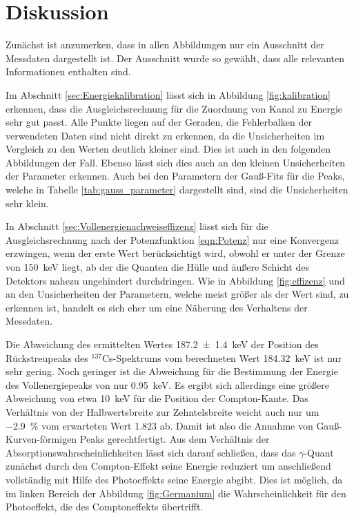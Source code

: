 \section{Diskussion}
\label{sec:Diskussion}
Zunächst ist anzumerken, dass in allen Abbildungen nur ein Ausschnitt
der Messdaten dargestellt ist. Der Ausschnitt wurde so gewählt, dass alle
relevanten Informationen enthalten sind.

Im Abschnitt \ref{sec:Energiekalibration} lässt sich in Abbildung \ref{fig:kalibration}
erkennen, dass die Ausgleichsrechnung für die Zuordnung von Kanal zu Energie
sehr gut passt. Alle Punkte liegen auf der Geraden, die Fehlerbalken der
verwendeten Daten sind nicht direkt zu erkennen, da die Unsicherheiten im Vergleich zu
den Werten deutlich kleiner sind. Dies ist auch in den folgenden Abbildungen
der Fall. Ebenso lässt sich dies auch an den kleinen Unsicherheiten der Parameter erkennen.
Auch bei den Parametern der Gauß-Fits für die Peaks, welche in Tabelle
\ref{tab:gauss_parameter} dargestellt sind, sind die Unsicherheiten sehr klein.

In Abschnitt \ref{sec:Vollenergienachweiseffizenz} lässt sich für die Ausgleichsrechnung nach
der Potenzfunktion \ref{eqn:Potenz} nur eine Konvergenz erzwingen, wenn der erste Wert
berücksichtigt wird, obwohl er unter der Grenze von \SI{150}{\kilo\electronvolt}
liegt, ab der die Quanten die Hülle und äußere Schicht des Detektors nahezu ungehindert 
durchdringen. Wie in Abbildung \ref{fig:effizenz} und an den Unsicherheiten der 
Parametern, welche meist größer als der Wert sind, zu erkennen ist, handelt es sich
eher um eine Näherung des Verhaltens der Messdaten.

Die Abweichung des ermittelten Wertes \SI{187.2(14)}{\kilo\electronvolt} der
Position des Rückstreupeaks des ${}^{137}$Cs-Spektrums vom
berechneten Wert \SI{184.32}{\kilo\electronvolt} ist nur sehr gering. Noch
geringer ist die Abweichung für die Bestimmung der Energie des Vollenergiepeaks
von nur \SI{0.95}{\kilo\electronvolt}. Es ergibt sich allerdings eine
größere Abweichung von etwa \SI{10}{\kilo\electronvolt} für die Position
der Compton-Kante.
Das Verhältnis von der Halbwertsbreite zur Zehntelsbreite weicht auch nur 
um \SI{-2.9}{\percent} vom erwarteten Wert \num{1.823} ab. Damit ist
also die Annahme von Gauß-Kurven-förmigen Peaks gerechtfertigt.
Aus dem Verhältnis der Absorptionswahrscheinlichkeiten lässt sich darauf schließen,
dass das $\gamma$-Quant zunächst durch den Compton-Effekt seine Energie reduziert
um anschließend vollständig mit Hilfe des Photoeffekts seine Energie abgibt.
Dies ist möglich, da im linken Bereich der Abbildung \ref{fig:Germanium}
die Wahrscheinlichkeit für den Photoeffekt, die des Comptoneffekts
übertrifft.

